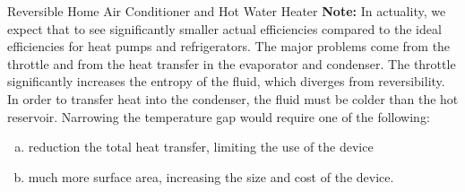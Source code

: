 \begin{example}{Reversible Home Air Conditioner and Hot Water Heater}
  {\bf Note:} In actuality, we expect that to see significantly smaller actual efficiencies compared to the ideal efficiencies for heat pumps and refrigerators.  The major problems come from the throttle and from the heat transfer in the evaporator and condenser.  The throttle significantly increases the entropy of the fluid, which diverges from reversibility.  In order to transfer heat into the condenser, the fluid must be colder than the hot reservoir.  Narrowing the temperature gap would require one of the following:
  \begin{enumerate}[a)]
  \item reduction the total heat transfer, limiting the use of the device
  \item much more surface area, increasing the size and cost of the device.
  \end{enumerate}
\end{example}


